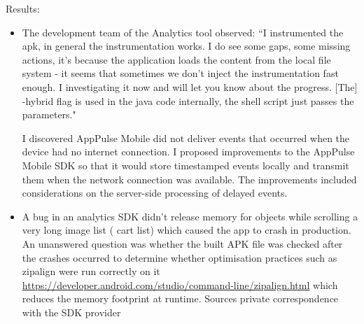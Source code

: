 Results:
\begin{itemize}
    \item The development team of the Analytics tool observed: ``I instrumented the apk, in general the instrumentation works. I do see some gaps, some missing actions, it’s because the application loads the content from the local file system - it seems that sometimes we don’t inject the instrumentation fast enough. I investigating it now and will let you know about the progress. [The] -hybrid flag is used in the java code internally, the shell script just passes the parameters." %
    \item [I discovered] AppPulse Mobile did not deliver events that occurred when the device had no internet connection. I proposed improvements to the AppPulse Mobile SDK so that it would store timestamped events locally and transmit them when the network connection was available. The improvements included considerations on the server-side processing of delayed events. %
    \item A bug in an analytics SDK didn't release memory for objects while scrolling a very long image list ( cart list) which caused the app to crash in production. An unanswered question was whether the built APK file was checked after the crashes occurred to determine whether optimisation practices such as zipalign were run correctly on it \url{https://developer.android.com/studio/command-line/zipalign.html} which reduces the memory footprint at runtime. Sources private correspondence with the SDK provider %
\end{itemize}

